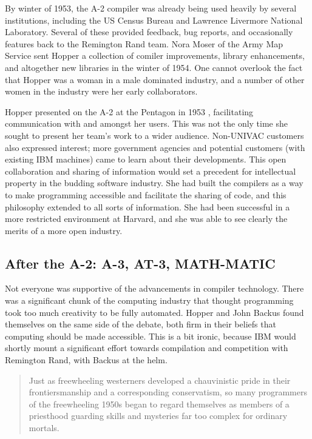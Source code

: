By winter of 1953, the A-2 compiler was already being used heavily
by several institutions, including the US Census Bureau and
Lawrence Livermore National Laboratory.
Several of these provided feedback, bug reports, and occasionally features
back to the Remington Rand team.
Nora Moser of the Army Map Service sent Hopper a collection of comiler
improvements, library enhancements, and altogether new libraries in the
winter of 1954.
One cannot overlook the fact that Hopper was a woman in a male dominated
industry, and a number of other women in the industry were her early
collaborators.

Hopper presented on the A-2 at the Pentagon in 1953
\cite{pentagon_hopper_univac_workshop_1953},
facilitating communication with and amongst her users.
This was not the only time she sought to present her team's work
to a wider audience.
Non-UNIVAC customers also expressed interest; more government
agencies and potential customers (with existing IBM machines)
came to learn about their developments.
This open collaboration and sharing of information would set a precedent
for intellectual property in the budding software industry.
She had built the compilers as a way to make programming accessible
and facilitate the sharing of code, and this philosophy extended to
all sorts of information.
She had been successful in a more restricted environment at Harvard,
and she was able to see clearly the merits of a more open industry.

\subsection{After the A-2: A-3, AT-3, MATH-MATIC}


Not everyone was supportive of the advancements in compiler technology.
There was a significant chunk of the computing industry that thought
programming took too much creativity to be fully automated.
Hopper and John Backus found themselves on the same side of the debate,
both firm in their beliefs that computing should be made accessible.
This is a bit ironic, because IBM would shortly mount a significant effort
towards compilation and competition with Remington Rand, with Backus at the helm.

\begin{quotation}
	Just as freewheeling westerners developed a chauvinistic pride in their
	frontiersmanship and a corresponding conservatism, so many programmers of the
	freewheeling 1950s began to regard themselves as members of a priesthood
	guarding skills and mysteries far too complex for ordinary mortals.
	\cite{Backus_1980_Programming_in_America_in_1950s}
\end{quotation}

